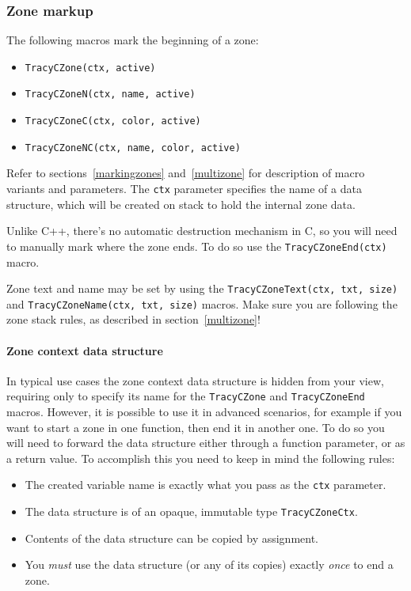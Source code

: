 \documentclass[hidelinks,titlepage,a4paper]{article}
\begin{document}
\subsubsection{Zone markup}
\label{czonemarkup}

The following macros mark the beginning of a zone:

\begin{itemize}
\item \texttt{TracyCZone(ctx, active)}
\item \texttt{TracyCZoneN(ctx, name, active)}
\item \texttt{TracyCZoneC(ctx, color, active)}
\item \texttt{TracyCZoneNC(ctx, name, color, active)}
\end{itemize}

Refer to sections~\ref{markingzones} and~\ref{multizone} for description of macro variants and parameters. The \texttt{ctx} parameter specifies the name of a data structure, which will be created on stack to hold the internal zone data.

Unlike C++, there's no automatic destruction mechanism in C, so you will need to manually mark where the zone ends. To do so use the \texttt{TracyCZoneEnd(ctx)} macro.

Zone text and name may be set by using the \texttt{TracyCZoneText(ctx, txt, size)} and \texttt{TracyCZoneName(ctx, txt, size)} macros. Make sure you are following the zone stack rules, as described in section~\ref{multizone}!

\paragraph{Zone context data structure}
\label{zonectx}

In typical use cases the zone context data structure is hidden from your view, requiring only to specify its name for the \texttt{TracyCZone} and \texttt{TracyCZoneEnd} macros. However, it is possible to use it in advanced scenarios, for example if you want to start a zone in one function, then end it in another one. To do so you will need to forward the data structure either through a function parameter, or as a return value. To accomplish this you need to keep in mind the following rules:

\begin{itemize}
\item The created variable name is exactly what you pass as the \texttt{ctx} parameter.
\item The data structure is of an opaque, immutable type \texttt{TracyCZoneCtx}.
\item Contents of the data structure can be copied by assignment.
\item You \emph{must} use the data structure (or any of its copies) exactly \emph{once} to end a zone.
\end{itemize}
\end{document}
